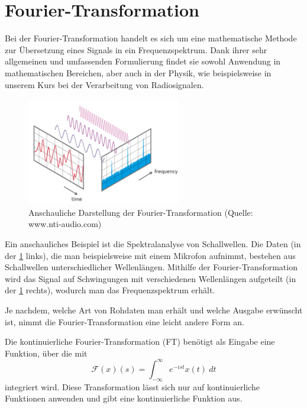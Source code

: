 \documentclass[]{dsadokumentation}
\begin{document}
\section{Fourier-Transformation}\label{k4.2.fourier}
Bei der Fourier-Transformation handelt es sich um eine mathematische Methode zur Übersetzung eines Signals in ein Frequenzspektrum. Dank ihrer sehr allgemeinen und umfassenden Formulierung findet sie sowohl Anwendung in mathematischen Bereichen, aber auch in der Physik, wie beispielsweise in unserem Kurs bei der Verarbeitung von Radiosignalen.

\begin{figure}[h]
    \centering
    \includegraphics[width=0.6\textwidth]{k4.2/fourier.png}
    \caption{Anschauliche Darstellung der Fourier-Transformation (Quelle: www.nti-audio.com)}
    \label{k4.2.fourier.img}
\end{figure}

Ein anschauliches Beispiel ist die Spektralanalyse von Schallwellen. Die Daten (in der \cref{k4.2.fourier.img} links), die man beispielsweise mit einem Mikrofon aufnimmt, bestehen aus Schallwellen unterschiedlicher Wellenlängen. Mithilfe der Fourier-Transformation wird das Signal auf Schwingungen mit verschiedenen Wellenl\"angen aufgeteilt (in der \cref{k4.2.fourier.img} rechts), wodurch man das Frequenzspektrum erhält.

Je nachdem, welche Art von Rohdaten man erhält und welche Ausgabe erwünscht ist, nimmt die Fourier-Transformation eine leicht andere Form an.

Die kontinuierliche Fourier-Transformation (FT) benötigt als Eingabe eine Funktion, über die mit
\begin{displaymath}
\mathcal{F}(x)(s)=\int_{-\infty}^{\infty}e^{-ist}x(t)\ dt
\end{displaymath}
integriert wird. Diese Transformation lässt sich nur auf kontinuierliche Funktionen anwenden und gibt eine kontinuierliche Funktion aus.
\end{document}
